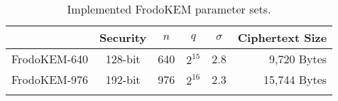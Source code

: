 \begin{table}[tbhp]
\caption{Implemented \textsf{FrodoKEM} parameter sets.}
\vspace{-0.2cm}

\label{tab:params}
\begin{center}
\begin{tabular}{l c c c c r}%
\hline \Tstrut

& Security
& $n$
& $q$
& $\sigma$
& {Ciphertext Size} \\

\hline \Tstrut
\textsf{FrodoKEM-640} & 128-bit &  640 & {$2^{15}$} & 2.8 & {9,720 Bytes} \\ 
\textsf{FrodoKEM-976} & 192-bit & 976  & {$2^{16}$} & 2.3 & {15,744 Bytes} \\
\hline \Tstrut
\end{tabular}
\end{center}
\end{table}

